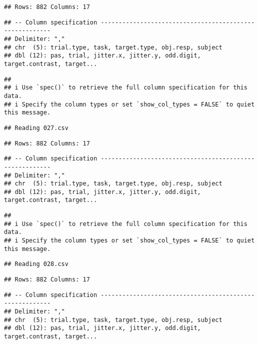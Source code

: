 \documentclass[
]{article}
\begin{document}
\begin{verbatim}
## Rows: 882 Columns: 17
\end{verbatim}

\begin{verbatim}
## -- Column specification --------------------------------------------------------
## Delimiter: ","
## chr  (5): trial.type, task, target.type, obj.resp, subject
## dbl (12): pas, trial, jitter.x, jitter.y, odd.digit, target.contrast, target...
\end{verbatim}

\begin{verbatim}
## 
## i Use `spec()` to retrieve the full column specification for this data.
## i Specify the column types or set `show_col_types = FALSE` to quiet this message.
\end{verbatim}

\begin{verbatim}
## Reading 027.csv
\end{verbatim}

\begin{verbatim}
## Rows: 882 Columns: 17
\end{verbatim}

\begin{verbatim}
## -- Column specification --------------------------------------------------------
## Delimiter: ","
## chr  (5): trial.type, task, target.type, obj.resp, subject
## dbl (12): pas, trial, jitter.x, jitter.y, odd.digit, target.contrast, target...
\end{verbatim}

\begin{verbatim}
## 
## i Use `spec()` to retrieve the full column specification for this data.
## i Specify the column types or set `show_col_types = FALSE` to quiet this message.
\end{verbatim}

\begin{verbatim}
## Reading 028.csv
\end{verbatim}

\begin{verbatim}
## Rows: 882 Columns: 17
\end{verbatim}

\begin{verbatim}
## -- Column specification --------------------------------------------------------
## Delimiter: ","
## chr  (5): trial.type, task, target.type, obj.resp, subject
## dbl (12): pas, trial, jitter.x, jitter.y, odd.digit, target.contrast, target...
\end{verbatim}
\end{document}
